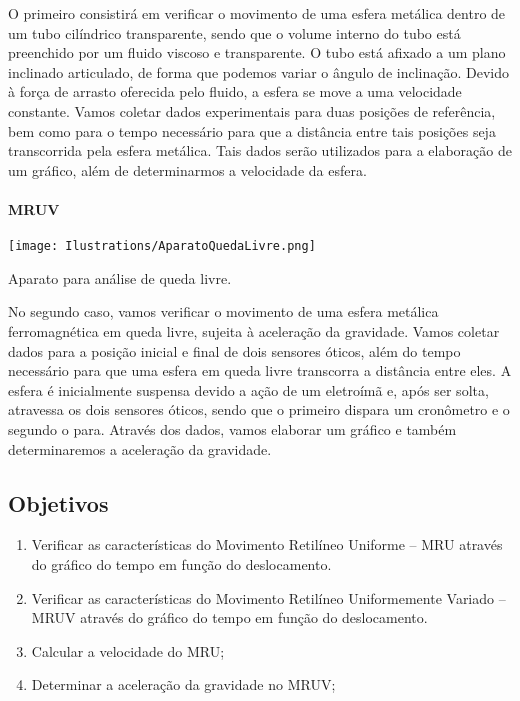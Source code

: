 O primeiro consistirá em verificar o movimento de uma esfera metálica dentro de um tubo cilíndrico transparente, sendo que o volume interno do tubo está preenchido por um fluido viscoso e transparente. O tubo está afixado a um plano inclinado articulado, de forma que podemos variar o ângulo de inclinação. Devido à força de arrasto oferecida pelo fluido, a esfera se move a uma velocidade constante. Vamos coletar dados experimentais para duas posições de referência, bem como para o tempo necessário para que a distância entre tais posições seja transcorrida pela esfera metálica. Tais dados serão utilizados para a elaboração de um gráfico, além de determinarmos a velocidade da esfera.

\paragraph{MRUV}

\begin{marginfigure}
\texttt{[image: Ilustrations/AparatoQuedaLivre.png]}
\caption{Aparato para análise de queda livre.}
\end{marginfigure}

No segundo caso, vamos verificar o movimento de uma esfera metálica ferromagnética em queda livre, sujeita à aceleração da gravidade. Vamos coletar dados para a posição inicial e final de dois sensores óticos, além do tempo necessário para que uma esfera em queda livre transcorra a distância entre eles. A esfera é inicialmente suspensa devido a ação de um eletroímã e, após ser solta, atravessa os dois sensores óticos, sendo que o primeiro dispara um cronômetro e o segundo o para. Através dos dados, vamos elaborar um gráfico e também determinaremos a aceleração da gravidade.

\subsection{Objetivos}

\begin{enumerate}
     \item Verificar as características do Movimento Retilíneo Uniforme -- MRU através do gráfico do tempo em função do deslocamento.
     \item Verificar as características do Movimento Retilíneo Uniformemente Variado -- MRUV através do gráfico do tempo em função do deslocamento.
     \item Calcular a velocidade do MRU;
     \item Determinar a aceleração da gravidade no MRUV;
\end{enumerate}

